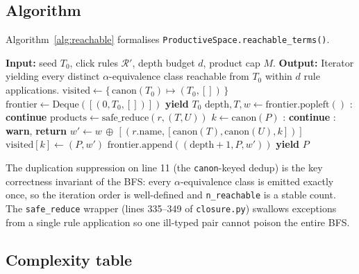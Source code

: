 \subsection{Algorithm}
\label{sec:closure-algorithm}

Algorithm~\ref{alg:reachable} formalises
\texttt{ProductiveSpace.reachable\_terms()}.

\begin{algorithm}[ht]
\caption{\texttt{ProductiveSpace.reachable\_terms()} — BFS closure over click rules.}
\label{alg:reachable}
\begin{algorithmic}[1]
\State \textbf{Input:}  seed $T_0$, click rules $\mathcal{R}'$, depth budget $d$, product cap $M$.
\State \textbf{Output:} Iterator yielding every distinct
       $\alpha$-equivalence class reachable from $T_0$ within $d$ rule applications.
\State $\mathrm{visited} \gets \{\, \mathrm{canon}(T_0) \mapsto (T_0, [])\, \}$ 
\State $\mathrm{frontier} \gets \mathrm{Deque}([(0, T_0, [])])$
\State \textbf{yield} $T_0$
  \State $\mathrm{depth}, T, w \gets \mathrm{frontier.popleft()}$
  : \textbf{continue}
      \State $\mathrm{products} \gets \mathrm{safe\_reduce}(r, (T, U))$
        \State $k \gets \mathrm{canon}(P)$
        : \textbf{continue}
        : \textbf{warn}, \textbf{return}
        \State $w' \gets w \,\oplus\, [(r.\mathrm{name}, [\mathrm{canon}(T), \mathrm{canon}(U), k])]$
        \State $\mathrm{visited}[k] \gets (P, w')$
        \State $\mathrm{frontier.append}((\mathrm{depth}+1, P, w'))$
        \State \textbf{yield} $P$
      \EndFor
    \EndFor
  \EndFor
\EndWhile
\end{algorithmic}
\end{algorithm}

The duplication suppression on line 11 (the
\texttt{canon}-keyed dedup) is the key correctness invariant of
the BFS: every $\alpha$-equivalence class is emitted exactly once,
so the iteration order is well-defined and \texttt{n\_reachable} is
a stable count.  The \texttt{safe\_reduce} wrapper (lines 335--349
of \texttt{closure.py}) swallows exceptions from a single rule
application so one ill-typed pair cannot poison the entire BFS.

\subsection{Complexity table}
\label{sec:closure-complexity}

